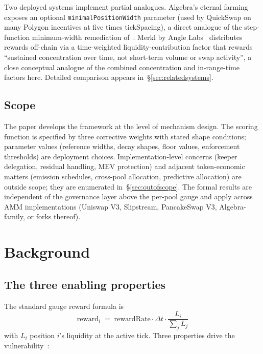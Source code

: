 \documentclass[11pt,a4paper]{article}
\theoremstyle{cgdefinition}
\theoremstyle{cgplain}
\theoremstyle{cgremark}
\begin{document}
Two deployed systems implement partial analogues. Algebra's eternal farming exposes an optional \texttt{minimalPositionWidth} parameter (used by QuickSwap on many Polygon incentives at five times tickSpacing), a direct analogue of the step-function minimum-width remediation of~\cite[\S5.2]{ryan2026c}. Merkl by Angle Labs~\cite{merkl2023} distributes rewards off-chain via a time-weighted liquidity-contribution factor that rewards ``sustained concentration over time, not short-term volume or swap activity'', a close conceptual analogue of the combined concentration and in-range-time factors here. Detailed comparison appears in~\S\ref{sec:relatedsystems}.

\subsection{Scope}\label{sec:scope}

The paper develops the framework at the level of mechanism design. The scoring function is specified by three corrective weights with stated shape conditions; parameter values (reference widths, decay shapes, floor values, enforcement thresholds) are deployment choices. Implementation-level concerns (keeper delegation, residual handling, MEV protection) and adjacent token-economic matters (emission schedules, cross-pool allocation, predictive allocation) are outside scope; they are enumerated in~\S\ref{sec:outofscope}. The formal results are independent of the governance layer above the per-pool gauge and apply across AMM implementations (Uniswap V3, Slipstream, PancakeSwap V3, Algebra-family, or forks thereof).

\section{Background}\label{sec:background}

\subsection{The three enabling properties}\label{sec:properties}

The standard gauge reward formula is
\begin{equation}
\text{reward}_i \;=\; \text{rewardRate} \cdot \Delta t \cdot \frac{L_i}{\sum_j L_j}
\end{equation}
with $L_i$ position $i$'s liquidity at the active tick. Three properties drive the vulnerability~\cite[\S1.1]{ryan2026c}:
\end{document}
